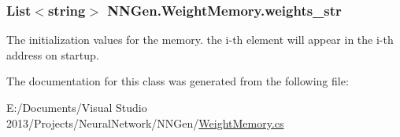 \subsubsection[{weights\+\_\+str}]{\setlength{\rightskip}{0pt plus 5cm}List$<$string$>$ N\+N\+Gen.\+Weight\+Memory.\+weights\+\_\+str\hspace{0.3cm}{\ttfamily [get]}}\label{class_n_n_gen_1_1_weight_memory_a969c7f7f162b75653ff1cb94eb1d11a8}


The initialization values for the memory. the i-\/th element will appear in the i-\/th address on startup. 



The documentation for this class was generated from the following file\+:\begin{DoxyCompactItemize}
\item 
E\+:/\+Documents/\+Visual Studio 2013/\+Projects/\+Neural\+Network/\+N\+N\+Gen/\hyperlink{_weight_memory_8cs}{Weight\+Memory.\+cs}\end{DoxyCompactItemize}
